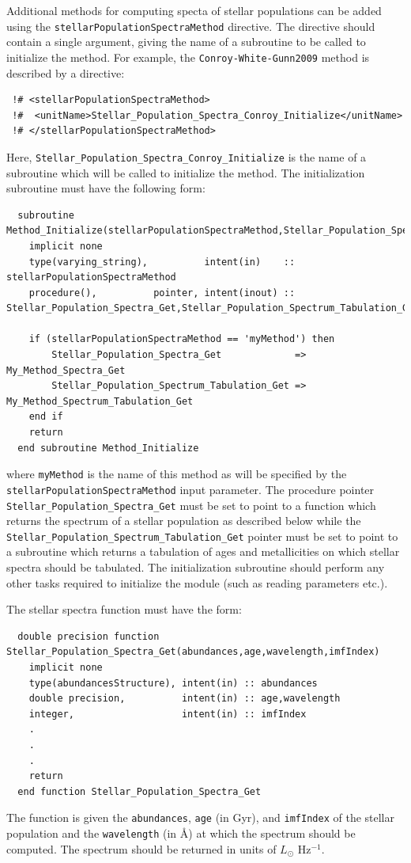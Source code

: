 Additional methods for computing specta of stellar populations can be added using the {\tt stellarPopulationSpectraMethod} directive. The directive should contain a single argument, giving the name of a subroutine to be called to initialize the method. For example, the {\tt Conroy-White-Gunn2009} method is described by a directive:
\begin{verbatim}
 !# <stellarPopulationSpectraMethod>
 !#  <unitName>Stellar_Population_Spectra_Conroy_Initialize</unitName>
 !# </stellarPopulationSpectraMethod>
\end{verbatim}
Here, {\tt Stellar\_Population\_Spectra\_Conroy\_Initialize} is the name of a subroutine which will be called to initialize the method. The initialization subroutine must have the following form:
\begin{verbatim}
  subroutine Method_Initialize(stellarPopulationSpectraMethod,Stellar_Population_Spectra_Get,Stellar_Population_Spectrum_Tabulation_Get)
    implicit none
    type(varying_string),          intent(in)    :: stellarPopulationSpectraMethod
    procedure(),          pointer, intent(inout) :: Stellar_Population_Spectra_Get,Stellar_Population_Spectrum_Tabulation_Get
    
    if (stellarPopulationSpectraMethod == 'myMethod') then
        Stellar_Population_Spectra_Get             => My_Method_Spectra_Get
        Stellar_Population_Spectrum_Tabulation_Get => My_Method_Spectrum_Tabulation_Get
    end if
    return
  end subroutine Method_Initialize
\end{verbatim}
where {\tt myMethod} is the name of this method as will be specified by the {\tt stellarPopulationSpectraMethod} input parameter. The procedure pointer {\tt Stellar\_Population\_Spectra\_Get} must be set to point to a function which returns the spectrum of a stellar population as described below while the {\tt Stellar\_Population\_Spectrum\_Tabulation\_Get} pointer must be set to point to a subroutine which returns a tabulation of ages and metallicities on which stellar spectra should be tabulated. The initialization subroutine should perform any other tasks required to initialize the module (such as reading parameters etc.).

The stellar spectra function must have the form:
\begin{verbatim}
  double precision function Stellar_Population_Spectra_Get(abundances,age,wavelength,imfIndex)
    implicit none
    type(abundancesStructure), intent(in) :: abundances
    double precision,          intent(in) :: age,wavelength
    integer,                   intent(in) :: imfIndex
    .
    .
    .
    return
  end function Stellar_Population_Spectra_Get
\end{verbatim}
The function is given the {\tt abundances}, {\tt age} (in Gyr), and {\tt imfIndex} of the stellar population and the {\tt wavelength} (in \AA) at which the spectrum should be computed. The spectrum should be returned in units of $L_\odot$ Hz$^{-1}$.

